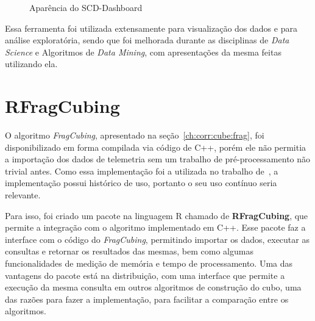 \begin{figure}[ht]
	\caption{Aparência do SCD-Dashboard}\label{fig:scddashboard}
	\vspace{6mm}
	\begin{center}
	\end{center}
	\vspace{4mm}
	\legenda{}
\end{figure}

Essa ferramenta foi utilizada extensamente para visualização dos dados e para análise exploratória, sendo que foi melhorada durante as disciplinas de \textit{Data Science} e Algoritmos de \textit{Data Mining}, com apresentações da mesma feitas utilizando ela.

\section{RFragCubing}\label{ch:impl:rfrag}

{\color{cerulean}
O algoritmo \textit{FragCubing}, apresentado na seção~\ref{ch:corr:cube:frag}, foi disponibilizado em forma compilada via código de C++, porém ele não permitia a importação dos dados de telemetria sem um trabalho de pré-processamento não trivial antes.
Como essa implementação foi a utilizada no trabalho de~\cite{silva:2015:abordagensParaCubo}, a implementação possui histórico de uso, portanto o seu uso contínuo seria relevante.
}

Para isso, foi criado um pacote na linguagem R chamado de \textbf{RFragCubing}, que permite a integração com o algoritmo implementado em C++.
Esse pacote faz a interface com o código do \textit{FragCubing}, permitindo importar os dados, executar as consultas e retornar os resultados das mesmas, bem como algumas funcionalidades de medição de memória e tempo de processamento.
Uma das vantagens do pacote está na distribuição, com uma interface que permite a execução da mesma consulta em outros algoritmos de construção do cubo, uma das razões para fazer a implementação, para facilitar a comparação entre os algoritmos.

